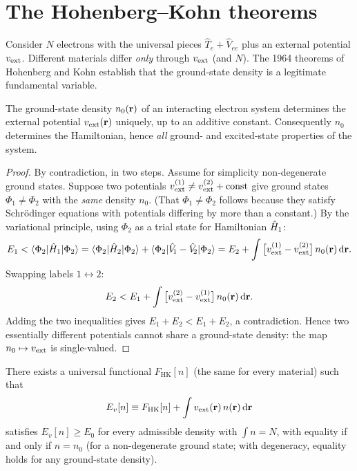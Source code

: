 \section{The Hohenberg--Kohn theorems}

Consider $N$ electrons with the universal pieces $\hat T_e + \hat V_{ee}$
plus an external potential $v_{\mathrm{ext}}$. Different materials differ \emph{only}
through $v_{\mathrm{ext}}$ (and $N$). The 1964 theorems of Hohenberg and Kohn establish
that the ground-state density is a legitimate fundamental variable.

\begin{theorem}
The ground-state density $n_0(\mathbf{r})$ of an interacting electron system
determines the external potential $v_{\mathrm{ext}}(\mathbf{r})$ uniquely, up to an additive
constant. Consequently $n_0$ determines the Hamiltonian, hence \emph{all}
ground- and excited-state properties of the system.
\end{theorem}

\begin{proof}
By contradiction, in two steps. Assume for simplicity non-degenerate ground
states. Suppose two potentials $v_{\mathrm{ext}}^{(1)} \neq v_{\mathrm{ext}}^{(2)} + \mathrm{const}$
give ground states $\Phi_1 \neq \Phi_2$ with the \emph{same} density $n_0$.
(That $\Phi_1\neq\Phi_2$ follows because they satisfy Schr\"odinger equations
with potentials differing by more than a constant.) By the variational
principle, using $\Phi_2$ as a trial state for Hamiltonian $\hat{H}_1$:
\begin{equation}
E_1 < \braket{\Phi_2|\hat{H}_1|\Phi_2}
= \braket{\Phi_2|\hat{H}_2|\Phi_2}
+ \braket{\Phi_2|\hat V_{\!1} - \hat V_{\!2}|\Phi_2}
= E_2 + \int \big[v_{\mathrm{ext}}^{(1)} - v_{\mathrm{ext}}^{(2)}\big]\, n_0(\mathbf{r})\, \mathrm{d}\mathbf{r} .
\end{equation}
Swapping labels $1\leftrightarrow 2$:
\begin{equation}
E_2 < E_1 + \int \big[v_{\mathrm{ext}}^{(2)} - v_{\mathrm{ext}}^{(1)}\big]\, n_0(\mathbf{r})\, \mathrm{d}\mathbf{r} .
\end{equation}
Adding the two inequalities gives $E_1 + E_2 < E_1 + E_2$, a contradiction.
Hence two essentially different potentials cannot share a ground-state
density: the map $n_0 \mapsto v_{\mathrm{ext}}$ is single-valued.
\end{proof}

\begin{theorem}
There exists a universal functional $F_{\mathrm{HK}}[n]$ (the same for every
material) such that
\begin{equation}
E_v[n] \equiv F_{\mathrm{HK}}[n] + \int v_{\mathrm{ext}}(\mathbf{r})\, n(\mathbf{r})\, \mathrm{d}\mathbf{r}
\end{equation}
satisfies $E_v[n] \geq E_0$ for every admissible density with $\int n = N$,
with equality if and only if $n = n_0$ (for a non-degenerate ground state;
with degeneracy, equality holds for any ground-state density).
\end{theorem}

